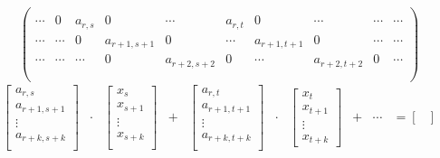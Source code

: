 $$
\begin{pmatrix}
  \\
  \cdots & 0 & a_{r,s} & 0 & \cdots & a_{r,t} & 0 & \cdots & \cdots & \cdots \\
  \cdots & \cdots & 0 & a_{r+1,s+1} & 0 & \cdots & a_{r+1,t+1} & 0 & \cdots & \cdots \\
  \cdots & \cdots & \cdots & 0 & a_{r+2,s+2} & 0 & \cdots & a_{r+2,t+2} & 0 & \cdots \\
  \\
\end{pmatrix}
$$
$$
\begin{matrix}
  \begin{bmatrix}
    a_{r,s}     \\
    a_{r+1,s+1} \\
       \vdots   \\
    a_{r+k,s+k} \\
  \end{bmatrix} & \cdot & \begin{bmatrix}
                            x_s      \\
                            x_{s+1}  \\
                              \vdots \\
                            x_{s+k}  \\
                          \end{bmatrix} & + & \begin{bmatrix}
                                              a_{r,t}     \\
                                              a_{r+1,t+1} \\
                                                \vdots    \\
                                              a_{r+k,t+k} \\
                                              \end{bmatrix} & \cdot & \begin{bmatrix}
                                                                        x_t \\
                                                                        x_{t+1} \\
                                                                        \vdots \\
                                                                        x_{t+k}
                                                                      \end{bmatrix} & + & \cdots & = \begin{bmatrix}

\end{bmatrix}
\end{matrix}$$
